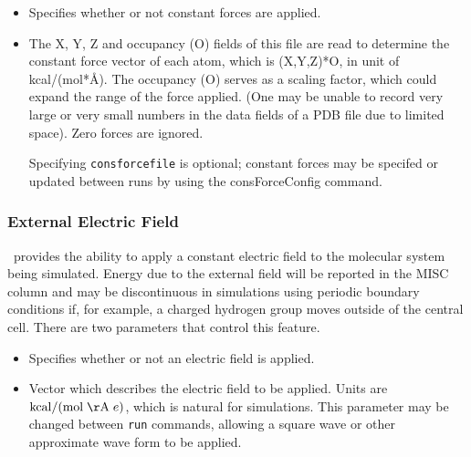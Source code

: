 \begin{itemize}

\item
{}
{Specifies whether or not constant forces are applied.}

\item
{}
{
The X, Y, Z and occupancy (O) fields of this file are read to
determine the constant force vector of each atom, which is
(X,Y,Z)*O, in unit of kcal/(mol*\AA). The occupancy (O) serves as
a scaling factor, which could expand the range of the force
applied. (One may be unable to record very large or very small
numbers in the data fields of a PDB file due to limited space).
Zero forces are ignored.

Specifying {\tt consforcefile} is optional; constant forces may be specifed
or updated between runs by using the consForceConfig command.
}

\end{itemize}


\subsubsection{External Electric Field}

\NAMD\ provides the ability to apply a constant electric field to the molecular
system being simulated.
Energy due to the external field will be reported in the MISC column
and may be discontinuous in simulations using periodic boundary conditions if,
for example, a charged hydrogen group moves outside of the central cell.
There are two parameters that control this feature.

\begin{itemize}

\item
{}
{Specifies whether or not an electric field is applied.}

\item
{}
{Vector which describes the electric field to be applied.
Units are ${\rm kcal} / ({\rm mol \; \AA} \; e)$, which is natural for simulations.
This parameter may be changed between {\tt run} commands, allowing a square
wave or other approximate wave form to be applied.}

\end{itemize}


